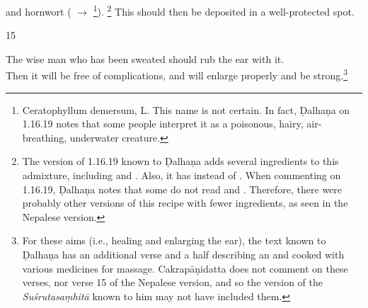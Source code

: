 \begin{translation}
         and hornwort ( $\rightarrow$
        \footnote{Ceratophyllum demersum, L. %
            This name is not certain. In fact, Ḍalhaṇa on 1.16.19
            \citep[79]{vulgate} notes that some people interpret it as a
            poisonous, hairy, air-breathing, underwater creature.}).%
            \footnote{The version of 1.16.19 known to Ḍalhaṇa \citep[79]{vulgate}
                adds several ingredients to this admixture, including  and . Also, it has
                 instead of . When commenting on
                1.16.19, Ḍalhaṇa \citep[79]{vulgate} notes that some do not read
                 and . Therefore, there were probably
                other versions of this recipe with fewer ingredients, as seen in the
                Nepalese version.} %
                This should then be deposited in a well-protected spot.
    
\item[15]%
    \begin{sloka}
The wise man who has been sweated should rub the  ear with
it.\\ Then it will be free of complications, and will enlarge properly and be
strong.\footnote{For these aims (i.e., healing and enlarging the ear), the text
    known to Ḍalhaṇa \citep[79]{vulgate} has an additional verse and a half describing
    an  and  cooked
    with various medicines for massage. Cakrapāṇidatta \citep[131]{acar-1939} does not
    comment on these verses, nor verse 15 of the Nepalese version, and so the version
    of the \emph{Suśrutasaṃhitā} known to him may not have included them.}
    \end{sloka}
    

\end{translation}
